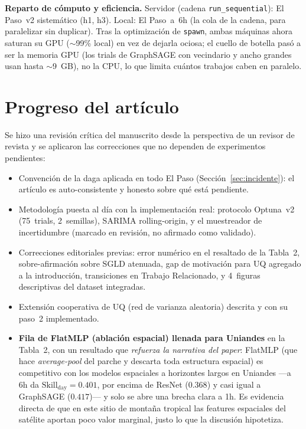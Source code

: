 \documentclass[12pt,a4paper]{article}
\begin{document}
\textbf{Reparto de cómputo y eficiencia.} Servidor (cadena
\texttt{run\_sequential}): El Paso~v2 sistemático (h1, h3). Local: El Paso~a~6h
(la cola de la cadena, para paralelizar sin duplicar). Tras la optimización de
\texttt{spawn}, ambas máquinas ahora saturan su GPU ($\sim$99\% local) en vez
de dejarla ociosa; el cuello de botella pasó a ser la memoria GPU (los trials
de GraphSAGE con vecindario y ancho grandes usan hasta $\sim$9~GB), no la CPU,
lo que limita cuántos trabajos caben en paralelo.

\section{Progreso del artículo}

Se hizo una revisión crítica del manuscrito desde la perspectiva de un
revisor de revista y se aplicaron las correcciones que no dependen de
experimentos pendientes:

\begin{itemize}[leftmargin=1.5em, noitemsep]
  \item Convención de la daga aplicada en todo El Paso (Sección~\ref{sec:incidente}):
        el artículo es auto-consistente y honesto sobre qué está pendiente.
  \item Metodología puesta al día con la implementación real: protocolo
        Optuna~v2 (75~trials, 2~semillas), SARIMA rolling-origin, y el
        muestreador de incertidumbre (marcado en revisión, no afirmado como
        validado).
  \item Correcciones editoriales previas: error numérico en el resaltado de
        la Tabla~2, sobre-afirmación sobre SGLD atenuada, gap de motivación
        para UQ agregado a la introducción, transiciones en Trabajo
        Relacionado, y 4~figuras descriptivas del dataset integradas.
  \item Extensión cooperativa de UQ (red de varianza aleatoria) descrita y
        con su paso~2 implementado.
  \item \textbf{Fila de FlatMLP (ablación espacial) llenada para Uniandes} en
        la Tabla~2, con un resultado que \emph{refuerza la narrativa del
        paper}: FlatMLP (que hace \emph{average-pool} del parche y descarta
        toda estructura espacial) es competitivo con los modelos espaciales a
        horizontes largos en Uniandes ---a 6h da $\text{Skill}_\text{day} =
        0.401$, por encima de ResNet ($0.368$) y casi igual a GraphSAGE
        ($0.417$)--- y solo se abre una brecha clara a 1h. Es evidencia
        directa de que en este sitio de montaña tropical las features
        espaciales del satélite aportan poco valor marginal, justo lo que la
        discusión hipotetiza.
\end{itemize}
\end{document}
